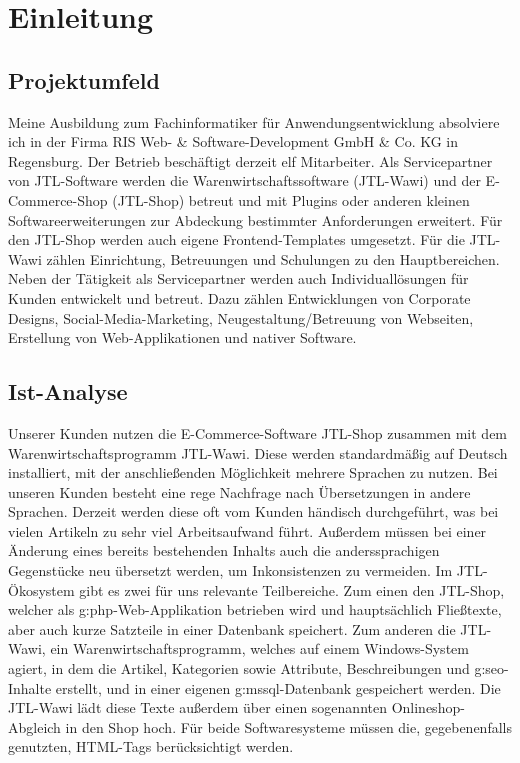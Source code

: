 \section{Einleitung}
\subsection{Projektumfeld}
Meine Ausbildung zum Fachinformatiker für Anwendungsentwicklung absolviere ich in der Firma RIS Web- \& Software-Development GmbH \& Co. KG in Regensburg. 
Der Betrieb beschäftigt derzeit elf Mitarbeiter. 
Als Servicepartner von JTL-Software werden die Warenwirtschaftssoftware (JTL-Wawi) und der E-Commerce-Shop (JTL-Shop) betreut und mit Plugins oder anderen kleinen Softwareerweiterungen zur Abdeckung bestimmter Anforderungen erweitert. 
Für den JTL-Shop werden auch eigene Frontend-Templates umgesetzt. Für die JTL-Wawi zählen Einrichtung, Betreuungen und Schulungen zu den Hauptbereichen. 
Neben der Tätigkeit als Servicepartner werden auch Individuallösungen für Kunden entwickelt und betreut. 
Dazu zählen Entwicklungen von Corporate Designs, Social-Media-Marketing, Neugestaltung/Betreuung von Webseiten, Erstellung von Web-Applikationen und nativer Software.


\subsection{Ist-Analyse}
Unserer Kunden nutzen die E-Commerce-Software JTL-Shop zusammen mit dem Warenwirtschaftsprogramm JTL-Wawi.
Diese werden standardmäßig auf Deutsch installiert, mit der anschließenden Möglichkeit mehrere Sprachen zu nutzen. 
Bei unseren Kunden besteht eine rege Nachfrage nach Übersetzungen in andere Sprachen. 
Derzeit werden diese oft vom Kunden händisch durchgeführt, was bei vielen Artikeln zu sehr viel Arbeitsaufwand führt.
Außerdem müssen bei einer Änderung eines bereits bestehenden Inhalts auch die anderssprachigen Gegenstücke neu übersetzt werden, um Inkonsistenzen zu vermeiden.
%
Im JTL-Ökosystem gibt es zwei für uns relevante Teilbereiche. Zum einen den JTL-Shop, welcher als \gls{g:php}-Web-Applikation betrieben wird und hauptsächlich Fließtexte, aber auch kurze Satzteile in einer Datenbank speichert.
Zum anderen die JTL-Wawi, ein Warenwirtschaftsprogramm, welches auf einem Windows-System agiert, in dem die Artikel, Kategorien sowie Attribute, Beschreibungen und \gls{g:seo}-Inhalte erstellt, und in einer eigenen \gls{g:mssql}-Datenbank gespeichert werden.
Die JTL-Wawi lädt diese Texte außerdem über einen sogenannten Onlineshop-Abgleich in den Shop hoch.
Für beide Softwaresysteme müssen die, gegebenenfalls genutzten, HTML-Tags berücksichtigt werden.

